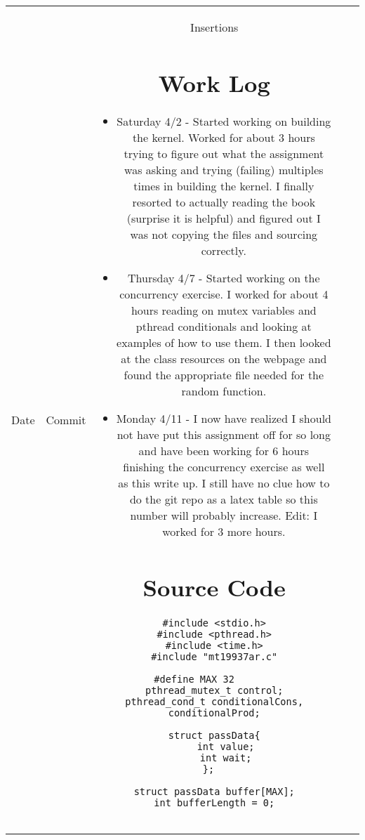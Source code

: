 \documentclass[letterpaper,10pt,titlepage,draftclsnofoot,onecolumn]{IEEEtran}
\begin{document}
\begin{tabular}{|| c c c c c}
\hline
Date & Commit & Insertions %
\hline








\section{Work Log}
\begin{itemize}
\item Saturday 4/2 - Started working on building the kernel. Worked for about 3 hours trying to figure out what the assignment was asking and trying (failing) multiples times in building the kernel. I finally resorted to actually reading the book (surprise it is helpful) and figured out I was not copying the files and sourcing correctly.
\item Thursday 4/7 - Started working on the concurrency exercise. I worked for about 4 hours reading on mutex variables and pthread conditionals and looking at examples of how to use them. I then looked at the class resources on the webpage and found the appropriate file needed for the random function.
\item Monday 4/11 - I now have realized I should not have put this assignment off for so long and have been working for 6 hours finishing the concurrency exercise as well as this write up. I still have no clue how to do the git repo as a latex table so this number will probably increase.  
Edit: I worked for 3 more hours.


\end{itemize}
\section{Source Code}
\lstset{language=C,
                basicstyle=\ttfamily,
                keywordstyle=\color{blue}\ttfamily,
                stringstyle=\color{red}\ttfamily,
                commentstyle=\color{green}\ttfamily,
                morecomment=[l][\color{magenta}]{\#}
}
\begin{lstlisting}
#include <stdio.h>
#include <pthread.h>
#include <time.h>
#include "mt19937ar.c"

#define MAX 32       
pthread_mutex_t control;
pthread_cond_t conditionalCons, conditionalProd;

struct passData{
	int value;
	int wait;
};	

struct passData buffer[MAX];
int bufferLength = 0;


\end{lstlisting}
\end{tabular}
\end{document}
